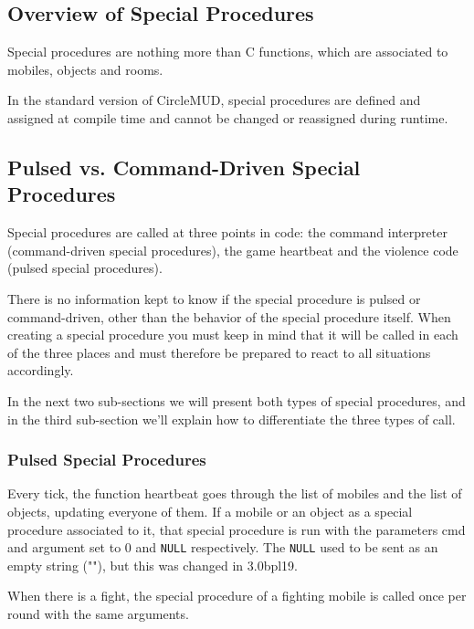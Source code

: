 \documentclass[11pt]{article}
\begin{document}
\subsection{Overview of Special Procedures}
Special procedures are nothing more than C functions, which are associated to mobiles, objects and rooms.
\par
In the standard version of CircleMUD, special procedures are defined and assigned at compile time and cannot be changed or reassigned during runtime.

\subsection{Pulsed vs. Command-Driven Special Procedures}
Special procedures are called at three points in code: the command interpreter (command-driven special procedures), the game heartbeat and the violence code (pulsed special procedures).
\par
There is no information kept to know if the special procedure is pulsed or command-driven, other than the behavior of the special procedure itself.  When creating a special procedure you must keep in mind that it will be called in each of the three places and must therefore be prepared to react to all situations accordingly.
\par
In the next two sub-sections we will present both types of special procedures, and in the third sub-section we'll explain how to differentiate the three types of call.

\subsubsection{Pulsed Special Procedures}
Every tick, the function heartbeat goes through the list of mobiles and the list of objects, updating everyone of them. If a mobile or an object as a special procedure associated to it, that special procedure is run with the parameters cmd and argument set to 0 and \texttt{NULL} respectively.  The \texttt{NULL} used to be sent as an empty string (""), but this was changed in 3.0bpl19.
\par
When there is a fight, the special procedure of a fighting mobile is called once per round with the same arguments.
\end{document}
